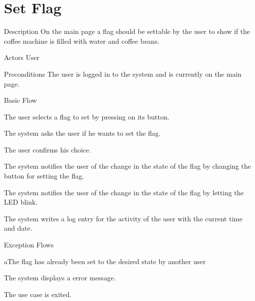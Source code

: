 \section{Set Flag}

%
\begin{cpart}{Description}
On the main page a flag should be settable by the user to show if the coffee machine is filled with water and coffee beans.
\end{cpart}


%
\begin{cpart}{Actors}
User
\end{cpart}

%
\begin{cpart}{Preconditions}
The user is logged in to the system and is currently on the main page.
\end{cpart}

%
\begin{cpartList}{Basic Flow}
  \item The user selects a flag to set by pressing on its button.
  \item The system asks the user if he wants to set the flag.
  \item The user confirms his choice.
  \item The system notifies the user of the change in the state of the flag by changing the button for setting the flag.
  \item The system notifies the user of the change in the state of the flag by letting the LED blink.
  \item The system writes a log entry for the activity of the user with the current time and date.
\end{cpartList}

%
\begin{cpartList}{Exception Flows}
  \begin{innerList}{4}{a}{The flag has already been set to the desired state by another user}
    \item The system displays a error message.
    \item The use case is exited.
  \end{innerList}
\end{cpartList}


